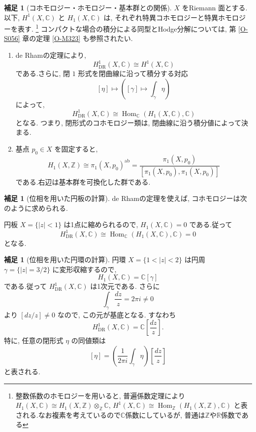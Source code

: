 \documentclass[dvipdfmx,a4paper,11pt]{article} %
\newcommand{\R}{\mathbb{R}}
\newcommand{\Z}{\mathbb{Z}}
\newcommand{\C}{\mathbb{C}}
\theoremstyle{definition}
\numberwithin{equation}{section}
\newtheorem{rem}[thm]{補足}
\begin{document}
\begin{rem}[コホモロジー・ホモロジー・基本群との関係]
$X$ をRiemann 面とする.
以下, $H^1(X,\C)$ と $H_1(X,\C)$ は, 
それぞれ特異コホモロジーと特異ホモロジーを表す.
\footnote{整数係数のホモロジーを用いると, 普遍係数定理により
$H_1(X,\C)\cong H_1(X,\Z)\otimes_{\Z}\C$, 
$H^1(X,\C)\cong\operatorname{Hom}_{\Z}(H_1(X,\Z),\C)$
と表される.なお複素を考えているので$\C$係数にしているが, 普通は$\Z$や$\R$係数である}
コンパクトな場合の積分による同型とHodge分解については,
第 \ref{O-S056} 章の定理 \ref{O-M323} も参照されたい.

\begin{enumerate}
\item
de Rhamの定理により, 
\[
H^1_{\mathrm{DR}}(X,\C)\cong H^1(X,\C)
\]
である.さらに, 閉 $1$ 形式を閉曲線に沿って積分する対応
\[
[\eta]\longmapsto
\left([\gamma]\longmapsto\int_\gamma\eta\right)
\]
によって, 
\[
H^1_{\mathrm{DR}}(X,\C)
\cong\operatorname{Hom}_{\C}(H_1(X,\C),\C)
\]
となる.
つまり, 閉形式のコホモロジー類は, 
閉曲線に沿う積分値によって決まる.

\item
基点 $p_0\in X$ を固定すると, 
\[
H_1(X,\Z)\cong
\pi_1(X,p_0)^{\mathrm{ab}}
=
\frac{\pi_1(X,p_0)}
{[\pi_1(X,p_0),\pi_1(X,p_0)]}
\]
である.右辺は基本群を可換化した群である.
\end{enumerate}
\end{rem}

\begin{rem}[位相を用いた円板の計算]

de Rhamの定理を使えば, コホモロジーは次のように求められる.

円板 $X=\{|z|<1\}$ は1点に縮められるので, 
$H_1(X,\C)=0$ である.従って
\[
H^1_{\mathrm{DR}}(X,\C)
\cong\operatorname{Hom}_{\C}(H_1(X,\C),\C)=0
\]
となる.

\end{rem}

\begin{rem}[位相を用いた円環の計算]
円環 $X=\{1<|z|<2\}$ は円周 $\gamma=\{|z|=3/2\}$ に変形収縮するので, 
\[
H_1(X,\C)=\C[\gamma]
\]
である.従って $H^1_{\mathrm{DR}}(X,\C)$ は1次元である.
さらに
\[
\int_\gamma\frac{dz}{z}=2\pi i\neq0
\]
より $[dz/z]\neq0$ なので, この元が基底となる.
すなわち
\[
H^1_{\mathrm{DR}}(X,\C)=\C\left[\frac{dz}{z}\right].
\]
特に, 任意の閉形式 $\eta$ の同値類は
\[
[\eta]=
\left(\frac{1}{2\pi i}\int_\gamma\eta\right)
\left[\frac{dz}{z}\right]
\]
と表される.

\end{rem}
\end{document}
